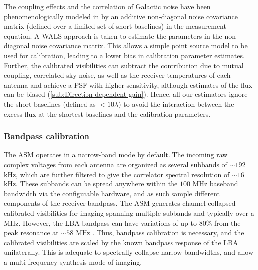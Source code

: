 \documentclass{aa}
\begin{document}
The  coupling  effects   and  the  correlation  of  Galactic   noise  have  been
phenomenologically   modeled  in   \citet{wijnholds2010self}   by  an   additive
non-diagonal  noise covariance  matrix  (defined  over a  limited  set of  short
baselines) in the measurement equation. A WALS approach is taken to estimate the
parameters in  the non-diagonal noise  covariance matrix.  This allows  a simple
point  source model  to be  used for  calibration, leading  to a  lower  bias in
calibration  parameter  estimates.   Further,  the calibrated  visibilities  can
subtract the contribution due to  mutual coupling, correlated sky noise, as well
as  the receiver  temperatures of  each antenna  and achieve  a PSF  with higher
sensitivity,    although    estimates    of    the   flux    can    be    biased
(\ref{sub:Direction-dependent-gain}).   Hence,  all  our estimators  ignore  the
short baselines (defined  as $<10\lambda$) to avoid the  interaction between the
excess flux at the shortest baselines and the calibration parameters.



\subsubsection{Bandpass calibration}

The ASM  operates in a  narrow-band mode by  default.  The incoming  raw complex
voltages from each antenna are organized as several subbands of $\sim$$192$ kHz,
which  are  further filtered  to  give  the  correlator spectral  resolution  of
$\sim$$16$  kHz. These  subbands can  be spread  anywhere within  the  $100$ MHz
baseband bandwidth via  the configurable hardware, and as  such sample different
components  of  the receiver  bandpass.   The  ASM  generates channel  collapsed
calibrated  visibilities for  imaging spanning  multiple subbands  and typically
over a MHz. However, the LBA bandpass can have variations of up to 80\% from the
peak  resonance at  $\sim$$58$ MHz  \citep{vanhaarlem2013lofar}.  Thus, bandpass
calibration  is necessary,  and the  calibrated visibilities  are scaled  by the
known bandpass response of the  LBA unilaterally. This is adequate to spectrally
collapse  narrow  bandwidths, and  allow  a  multi-frequency  synthesis mode  of
imaging.
\end{document}
